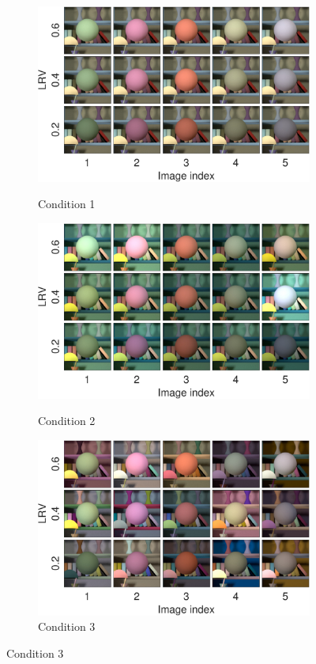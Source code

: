 \documentclass{jov}
\begin{document}
\begin{figure}
\centering
	\begin{subfigure}{0.33 \textwidth}
		\caption{Condition 1}
		\includegraphics[width=\textwidth]{../FiguresDraft5/Figure1/Figure1_b.pdf}
 		\label{fig:backgroundVarying}
	\end{subfigure}
	\begin{subfigure}{0.33 \textwidth}
        \caption{Condition 2}	
        \includegraphics[width=\textwidth]{../FiguresDraft5/Figure5/Figure5_b.pdf}
        \label{fig:targetIlluminantVarying}
    \end{subfigure}
	\begin{subfigure}{0.33 \textwidth}
	\caption{Condition 3}	
        \includegraphics[width=\textwidth]{../FiguresDraft5/Figure5/Figure5_c.pdf}        

\end{subfigure}
\end{figure}
\end{document}
